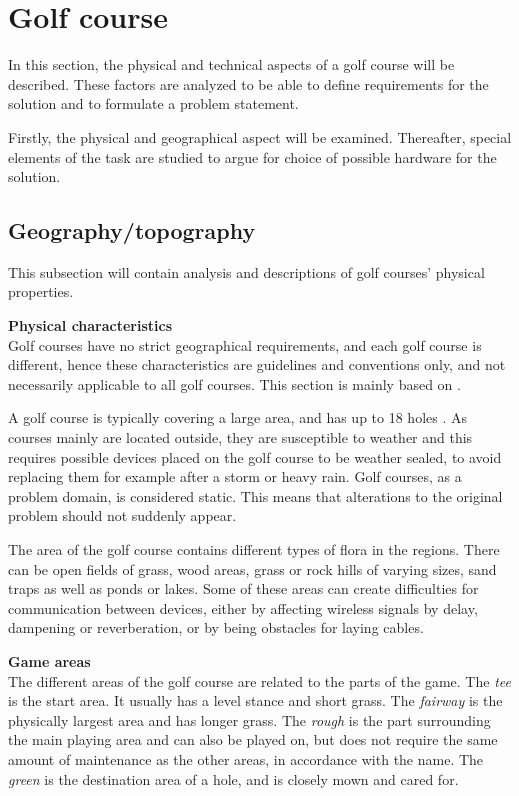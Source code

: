 \section{Golf course}
In this section, the physical and technical aspects of a golf course will be described. These factors are analyzed to be able to define requirements for the solution and to formulate a problem statement.

Firstly, the physical and geographical aspect will be examined. Thereafter, special elements of the task are studied to argue for choice of possible hardware for the solution. 

\subsection{Geography/topography}
This subsection will contain analysis and descriptions of golf courses' physical properties.

\textbf{Physical characteristics}\\
Golf courses have no strict geographical requirements, and each golf course is different, hence these characteristics are guidelines and conventions only, and not necessarily applicable to all golf courses. This section is mainly based on \cite{golfCourse}.

A golf course is typically covering a large area, and has up to 18 holes \cite{golfCourse}. As courses mainly are located outside, they are susceptible to weather and this requires possible devices placed on the golf course to be weather sealed, to avoid replacing them for example after a storm or heavy rain. Golf courses, as a problem domain, is considered static. This means that alterations to the original problem should not suddenly appear. %

The area of the golf course contains different types of flora in the regions. There can be open fields of grass, wood areas, grass or rock hills of varying sizes, sand traps as well as ponds or lakes. Some of these areas can create difficulties for communication between devices, either by affecting wireless signals by delay, dampening or reverberation, or by being obstacles for laying cables. 

\textbf{Game areas}\\
The different areas of the golf course are related to the parts of the game. The \textit{tee} is the start area. It usually has a level stance and short grass. The \textit{fairway} is the physically largest area and has longer grass. The \textit{rough} is the part surrounding the main playing area and can also be played on, but does not require the same amount of maintenance as the other areas, in accordance with the name. The \textit{green} is the destination area of a hole, and is closely mown and cared for. 

